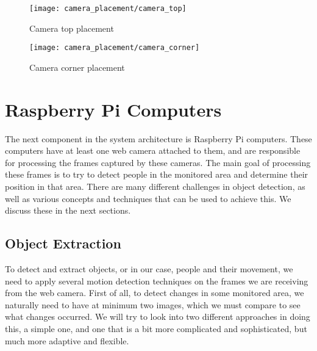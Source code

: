 \begin{figure}[ht]
	\centering
	\texttt{[image: camera\_placement/camera\_top]}
	\caption{Camera top placement}
	\label{fig:camera_top}
\end{figure}

\begin{figure}[ht]
	\centering
	\texttt{[image: camera\_placement/camera\_corner]}
	\caption{Camera corner placement}
	\label{fig:camera_corner}
\end{figure}

\section{Raspberry Pi Computers}
The next component in the system architecture is Raspberry Pi computers. These computers have at least one web camera attached to them, and are responsible for processing the frames captured by these cameras. The main goal of processing these frames is to try to detect people in the monitored area and determine their position in that area. There are many different challenges in object detection, as well as various concepts and techniques that can be used to achieve this. We discuss these in the next sections.
	
	\subsection{Object Extraction}
	To detect and extract objects, or in our case, people and their movement, we need to apply several motion detection techniques on the frames we are receiving from the web camera. First of all, to detect changes in some monitored area, we naturally need to have at minimum two images, which we must compare to see what changes occurred. We will try to look into two different approaches in doing this, a simple one, and one that is a bit more complicated and sophisticated, but much more adaptive and flexible.
	
